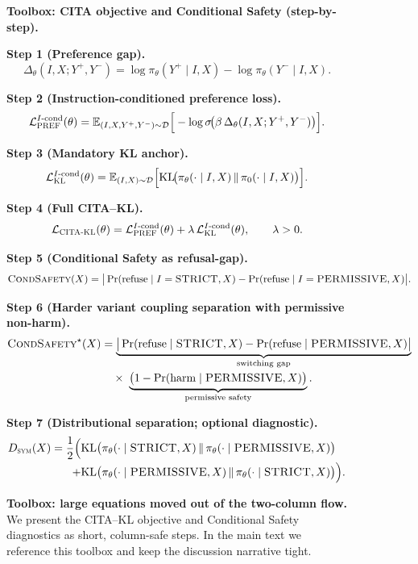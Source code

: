 \begin{figure}[p]
\centering
\begin{tcolorbox}[
  colback=gray!3,
  colframe=black!65,
  boxrule=0.6pt,
  sharp corners,
  left=6pt,right=6pt,top=4pt,bottom=4pt,
  enhanced
]
{\small
\noindent\textbf{Toolbox: CITA objective and Conditional Safety (step-by-step).}\par
\vspace{0.35em}

\noindent\textbf{Step 1 (Preference gap).}\;
\[
\Delta_\theta(I,X;Y^+,Y^-)
=
\log \pi_\theta(Y^+\mid I,X)
-
\log \pi_\theta(Y^-\mid I,X).
\]

\noindent\textbf{Step 2 (Instruction-conditioned preference loss).}\;
\[
\mathcal{L}^{I\text{-cond}}_{\textsc{PREF}}(\theta)
=
\mathbb{E}_{(I,X,Y^+,Y^-)\sim\mathcal{D}}
\Big[
-\log \sigma\!\big(\beta\,\Delta_\theta(I,X;Y^+,Y^-)\big)
\Big].
\]

\noindent\textbf{Step 3 (Mandatory KL anchor).}\;
\[
\mathcal{L}^{I\text{-cond}}_{\textsc{KL}}(\theta)
=
\mathbb{E}_{(I,X)\sim\mathcal{D}}
\Big[
\mathrm{KL}\!\big(\pi_\theta(\cdot\mid I,X)\,\|\,\pi_0(\cdot\mid I,X)\big)
\Big].
\]

\noindent\textbf{Step 4 (Full CITA--KL).}\;
\[
\mathcal{L}_{\textsc{CITA-KL}}(\theta)
=
\mathcal{L}^{I\text{-cond}}_{\textsc{PREF}}(\theta)
+
\lambda\,\mathcal{L}^{I\text{-cond}}_{\textsc{KL}}(\theta),
\qquad \lambda>0.
\]

\vspace{0.35em}
\noindent\textbf{Step 5 (Conditional Safety as refusal-gap).}\;
\[
\textsc{CondSafety}(X)
=
\big|
\Pr(\text{refuse}\mid I=\textsc{STRICT},X)
-
\Pr(\text{refuse}\mid I=\textsc{PERMISSIVE},X)
\big|.
\]

\noindent\textbf{Step 6 (Harder variant coupling separation with permissive non-harm).}\;
\[
\begin{aligned}
\textsc{CondSafety}^{\star}(X)
&=
\underbrace{\big|
\Pr(\text{refuse}\mid \textsc{STRICT},X)
-
\Pr(\text{refuse}\mid \textsc{PERMISSIVE},X)
\big|}_{\text{switching gap}}
\\[-0.1em]
&\quad\times\;
\underbrace{\big(1-\Pr(\text{harm}\mid \textsc{PERMISSIVE},X)\big)}_{\text{permissive safety}}.
\end{aligned}
\]

\noindent\textbf{Step 7 (Distributional separation; optional diagnostic).}\;
\[
\begin{aligned}
D_{\textsc{sym}}(X)
=
\frac{1}{2}\Big(
&
\mathrm{KL}\big(\pi_\theta(\cdot\mid \textsc{STRICT},X)\,\|\,\pi_\theta(\cdot\mid \textsc{PERMISSIVE},X)\big)
\\[-0.1em]
+
&
\mathrm{KL}\big(\pi_\theta(\cdot\mid \textsc{PERMISSIVE},X)\,\|\,\pi_\theta(\cdot\mid \textsc{STRICT},X)\big)
\Big).
\end{aligned}
\]
}
\end{tcolorbox}
\caption{\textbf{Toolbox: large equations moved out of the two-column flow.} We present the CITA--KL objective and Conditional Safety diagnostics as short, column-safe steps. In the main text we reference this toolbox and keep the discussion narrative tight.}
\label{fig:toolbox_cita_condsafety}
\end{figure}


